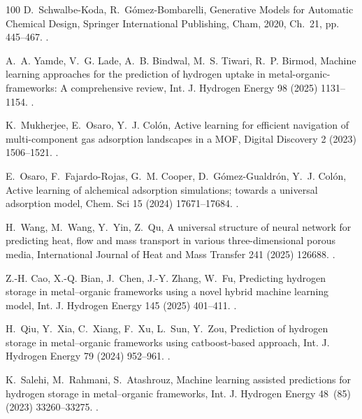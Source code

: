 \documentclass[review]{elsarticle}
\begin{document}
\begin{thebibliography}{100}
D.~Schwalbe-Koda, R.~G{\'o}mez-Bombarelli, Generative Models for Automatic
  Chemical Design, Springer International Publishing, Cham, 2020, Ch.~21, pp.
  445--467.
\newblock \href {https://doi.org/10.1007/978-3-030-40245-7\_21}
  {}.

A.~A. Yamde, V.~G. Lade, A.~B. Bindwal, M.~S. Tiwari, R.~P. Birmod, Machine
  learning approaches for the prediction of hydrogen uptake in
  metal-organic-frameworks: A comprehensive review, Int. J. Hydrogen Energy 98
  (2025) 1131--1154.
\newblock \href {https://doi.org/10.1016/j.ijhydene.2024.12.131}
  {}.

K.~Mukherjee, E.~Osaro, Y.~J. Colón, Active learning for efficient navigation
  of multi-component gas adsorption landscapes in a {MOF}, Digital Discovery 2
  (2023) 1506--1521.
\newblock \href {https://doi.org/10.1039/D3DD00106G}
  {}.

E.~Osaro, F.~Fajardo-Rojas, G.~M. Cooper, D.~Gómez-Gualdrón, Y.~J. Colón,
  Active learning of alchemical adsorption simulations; towards a universal
  adsorption model, Chem. Sci 15 (2024) 17671--17684.
\newblock \href {https://doi.org/10.1039/D4SC02156H}
  {}.

H.~Wang, M.~Wang, Y.~Yin, Z.~Qu, A universal structure of neural network for
  predicting heat, flow and mass transport in various three-dimensional porous
  media, International Journal of Heat and Mass Transfer 241 (2025) 126688.
\newblock \href {https://doi.org/10.1016/j.ijheatmasstransfer.2025.126688}
  {}.

Z.-H. Cao, X.-Q. Bian, J.~Chen, J.-Y. Zhang, W.~Fu, Predicting hydrogen storage
  in metal–organic frameworks using a novel hybrid machine learning model,
  Int. J. Hydrogen Energy 145 (2025) 401--411.
\newblock \href {https://doi.org/10.1016/j.ijhydene.2025.06.112}
  {}.

H.~Qiu, Y.~Xia, C.~Xiang, F.~Xu, L.~Sun, Y.~Zou, Prediction of hydrogen storage
  in metal–organic frameworks using catboost-based approach, Int. J. Hydrogen
  Energy 79 (2024) 952--961.
\newblock \href {https://doi.org/10.1016/j.ijhydene.2024.07.078}
  {}.

K.~Salehi, M.~Rahmani, S.~Atashrouz, Machine learning assisted predictions for
  hydrogen storage in metal–organic frameworks, Int. J. Hydrogen Energy
  48~(85) (2023) 33260--33275.
\newblock \href {https://doi.org/10.1016/j.ijhydene.2023.04.338}
  {}.


\end{thebibliography}
\end{document}
